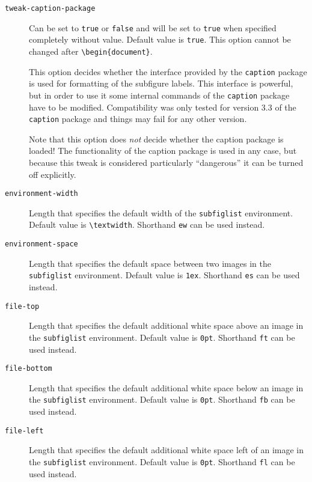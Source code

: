 \documentclass[version=3.12,american]{scrartcl}
\begin{document}
\begin{description}
\item[\texttt{tweak-caption-package}\enskip] Can be set to \texttt{true} or \texttt{false} and will be set to \texttt{true} when specified completely without value. Default value is \texttt{true}. This option cannot be changed after \verb|\begin{document}|.

This option decides whether the interface provided by the \texttt{caption} package is used for formatting of the subfigure labels. This interface is powerful, but in order to use it some internal commands of the \texttt{caption} package have to be modified. Compatibility was only tested for version 3.3 of the \texttt{caption} package and things may fail for any other version.

Note that this option does \emph{not} decide whether the caption package is loaded! The functionality of the caption package is used in any case, but because this tweak is considered particularly ``dangerous'' it can be turned off explicitly.

\item[\texttt{environment-width}\enskip] Length that specifies the default width of the \texttt{subfiglist} environment. Default value is \verb|\textwidth|. Shorthand \texttt{ew} can be used instead.

\item[\texttt{environment-space}\enskip] Length that specifies the default space between two images in the \texttt{subfiglist} environment. Default value is \texttt{1ex}. Shorthand \texttt{es} can be used instead.

\item[\texttt{file-top}\enskip] Length that specifies the default additional white space above an image in the \texttt{subfiglist} environment. Default value is \texttt{0pt}. Shorthand \texttt{ft} can be used instead.

\item[\texttt{file-bottom}\enskip] Length that specifies the default additional white space below an image in the \texttt{subfiglist} environment. Default value is \texttt{0pt}. Shorthand \texttt{fb} can be used instead.

\item[\texttt{file-left}\enskip] Length that specifies the default additional white space left of an image in the \texttt{subfiglist} environment. Default value is \texttt{0pt}. Shorthand \texttt{fl} can be used instead.


\end{description}
\end{document}
